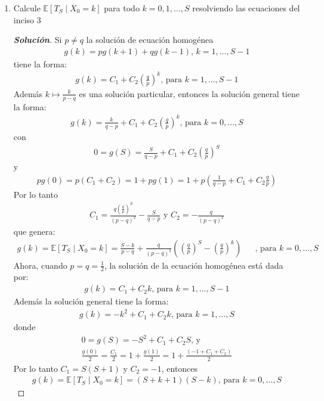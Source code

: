 \documentclass[12pt, letterpaper]{article}
\newenvironment{manualtheorem}[1]{%
  \renewcommand\themanualtheoreminner{#1}%
  \manualtheoreminner
}{\endmanualtheoreminner}
\newenvironment{solucion}
  {\renewcommand\qedsymbol{$\square$}\begin{proof}[\textbf{Solución}]}
  {\end{proof}}
\begin{document}
\begin{manualtheorem}{3.2}
\begin{enumerate}
        \item Calcule $\mathbb{E}[T_S \mid X_0 = k]$ para todo $k=0,1,\dots,S$ resolviendo las ecuaciones del inciso 3
        \begin{solucion}
            Si $p\neq q$ la solución de ecuación homogénea
            \begin{align*}
                g(k)=pg(k+1)+qg(k-1)\textrm{, }k=1,\dots,S-1
            \end{align*}
            tiene la forma:
            \begin{align*}
                g(k)=C_1+C_2(\frac{q}{p})^k\textrm{, para } k=1,\dots,S-1
            \end{align*}
            Además $k \mapsto \frac{k}{p-q}$ es una solución particular, entonces la solución general tiene la forma:
            \begin{align*}
                g(k)=\frac{k}{q-p}+C_1+C_2(\frac{q}{p})^k\textrm{, para }k=0,\dots,S
            \end{align*}
            con
            \begin{align*}
                0=g(S)=\frac{S}{q-p}+C_1+C_2(\frac{q}{p})^S
            \end{align*}
            y
            \begin{align*}
                pg(0)=p(C_1+C_2)=1+pg(1)=1+p(\frac{1}{q-p}+C_1+C_2\frac{q}{p})
            \end{align*}
            Por lo tanto
            \begin{align*}
                C_1=\frac{q(\frac{q}{p})^S}{(p-q)^2}-\frac{S}{q-p} \textrm{ y } C_2=-\frac{q}{(p-q)^2}
            \end{align*}
            que genera:
            \begin{align*}
            g(k)=\mathbb{E}[T_S \mid X_0 = k]=\frac{S-k}{p-q}+\frac{q}{(p-q)^2}((\frac{q}{p})^S-(\frac{q}{p})^k)& &\textrm{, para }k=0,\dots,S
            \end{align*}
            Ahora, cuando $p=q=\frac{1}{2}$, la solución de la ecuación homogénea está dada por:
            \begin{align*}
                g(k)=C_1+C_2k\textrm{, para }k=1,\dots,S-1
            \end{align*}
            Además la solución general tiene la forma:
            \begin{align*}
                g(k)=-k^2+C_1+C_2k\textrm{, para }k=1,\dots,S
            \end{align*}
            donde 
            \begin{align*}
                0=g(S)=-S^2+C_1+C_2S\textrm{, y }\\
                \frac{g(0)}{2}=\frac{C_1}{2}=1+\frac{g(1)}{2}=1+\frac{(-1+C_1+C_2)}{2}
            \end{align*}
            Por lo tanto $C_1=S(S+1)$ y $C_2=-1$, entonces
            \begin{align*}
                g(k)=\mathbb{E}[T_S \mid X_0 = k]=(S+k+1)(S-k)\textrm{, para }k=0,\dots,S
            \end{align*}
        \end{solucion}
        

\end{enumerate}
\end{manualtheorem}
\end{document}
